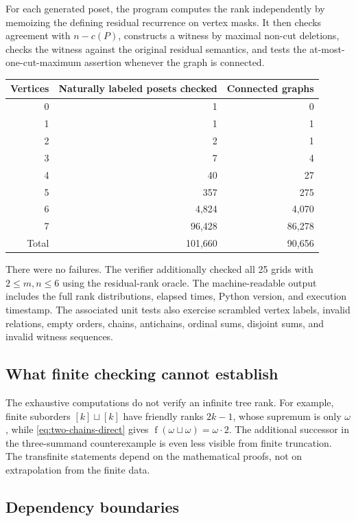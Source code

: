 \documentclass[11pt,a4paper]{article}
\theoremstyle{definition}
\theoremstyle{remark}
\DeclareMathOperator{\fot}{f}
\newcommand{\ds}{\mathbin{\sqcup}}
\begin{document}
For each generated poset, the program computes the rank independently by
memoizing the defining residual recurrence on vertex masks. It then checks
agreement with $n-c(P)$, constructs a witness by maximal non-cut deletions,
checks the witness against the original residual semantics, and tests the
at-most-one-cut-maximum assertion whenever the graph is connected.

\begin{center}
\begin{tabular}{@{}rrr@{}}
\toprule
Vertices & Naturally labeled posets checked & Connected graphs\\
\midrule
0 & 1 & 0\\
1 & 1 & 1\\
2 & 2 & 1\\
3 & 7 & 4\\
4 & 40 & 27\\
5 & 357 & 275\\
6 & 4,824 & 4,070\\
7 & 96,428 & 86,278\\
\midrule
Total & 101,660 & 90,656\\
\bottomrule
\end{tabular}
\end{center}

There were no failures. The verifier additionally checked all 25 grids with
$2\leq m,n\leq6$ using the residual-rank oracle. The machine-readable output
includes the full rank distributions, elapsed times, Python version, and
execution timestamp. The associated unit tests also exercise scrambled
vertex labels, invalid relations, empty orders, chains, antichains, ordinal
sums, disjoint sums, and invalid witness sequences.

\subsection{What finite checking cannot establish}

The exhaustive computations do not verify an infinite tree rank. For
example, finite suborders $[k]\ds[k]$ have friendly ranks $2k-1$, whose
supremum is only $\omega$, while \eqref{eq:two-chains-direct} gives
$\fot(\omega\ds\omega)=\omega\cdot2$. The additional successor in the
three-summand counterexample is even less visible from finite truncation.
The transfinite statements depend on the mathematical proofs, not on
extrapolation from the finite data.

\subsection{Dependency boundaries}
\end{document}
